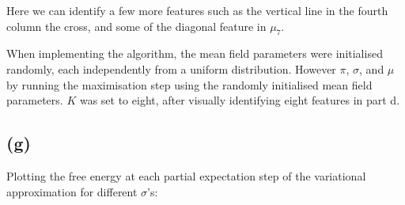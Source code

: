 \documentclass[12pt]{article}
\begin{document}
Here we can identify a few more features such as the vertical line in the fourth column the cross, and some of the diagonal feature in $\mu_7$.

When implementing the algorithm, the mean field parameters were initialised randomly, each independently from a uniform distribution. However $\pi$, $\sigma$, and $\mu$ by running the maximisation step using the randomly initialised mean field parameters. $K$ was set to eight, after visually identifying eight features in part d.


\newpage
\subsection*{(g)}


Plotting the free energy at each partial expectation step of the variational approximation for different $\sigma$'s:
\end{document}
